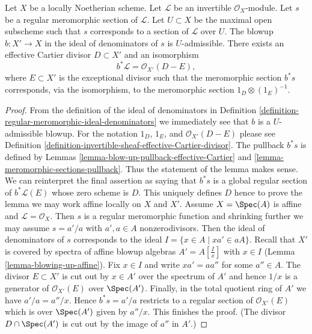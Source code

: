 \begin{lemma}
\label{lemma-blowing-up-denominators}
Let $X$ be a locally Noetherian scheme.
Let $\mathcal{L}$ be an invertible $\mathcal{O}_X$-module.
Let $s$ be a regular meromorphic section of $\mathcal{L}$.
Let $U \subset X$ be the maximal open subscheme such that
$s$ corresponds to a section of $\mathcal{L}$ over $U$.
The blowup $b : X' \to X$ in the ideal of denominators
of $s$ is $U$-admissible. There exists an effective Cartier divisor
$D \subset X'$ and an isomorphism
$$
b^*\mathcal{L} = \mathcal{O}_{X'}(D - E),
$$
where $E \subset X'$ is the exceptional divisor such that the
meromorphic section $b^*s$ corresponds, via the isomorphism,
to the meromorphic section $1_D \otimes (1_E)^{-1}$.
\end{lemma}

\begin{proof}
From the definition of the ideal of denominators in
Definition
\ref{definition-regular-meromorphic-ideal-denominators}
we immediately see that $b$ is a $U$-admissible blowup.
For the notation $1_D$, $1_E$, and $\mathcal{O}_{X'}(D - E)$
please see Definition
\ref{definition-invertible-sheaf-effective-Cartier-divisor}.
The pullback $b^*s$ is defined by
Lemmas \ref{lemma-blow-up-pullback-effective-Cartier} and
\ref{lemma-meromorphic-sections-pullback}.
Thus the statement of the lemma makes sense.
We can reinterpret the final assertion as saying
that $b^*s$ is a global regular section of
$b^*\mathcal{L}(E)$ whose zero scheme is $D$.
This uniquely defines $D$ hence
to prove the lemma we may work affine locally on $X$ and $X'$.
Assume $X = \Spec(A)$ is affine and
$\mathcal{L} = \mathcal{O}_X$. Then $s$ is a regular meromorphic
function and shrinking further we may assume
$s = a'/a$ with $a', a \in A$ nonzerodivisors.
Then the ideal of denominators of $s$ corresponds
to the ideal $I = \{x \in A \mid xa' \in aA\}$.
Recall that $X'$ is covered by spectra of affine blowup
algebras $A' = A[\frac{I}{x}]$ with $x \in I$
(Lemma \ref{lemma-blowing-up-affine}). Fix $x \in I$ and
write $xa' = a a''$ for some $a'' \in A$.
The divisor $E \subset X'$ is cut out by $x \in A'$ over
the spectrum of $A'$ and hence $1/x$ is a 
generator of $\mathcal{O}_{X'}(E)$ over $\Spec(A')$.
Finally, in the total quotient ring
of $A'$ we have $a'/a = a''/x$. Hence $b^*s = a'/a$ restricts
to a regular section of $\mathcal{O}_{X'}(E)$ which is
over $\Spec(A')$ given by $a''/x$. This finishes the proof.
(The divisor $D \cap \Spec(A')$ is cut out by the image of
$a''$ in $A'$.)
\end{proof}





